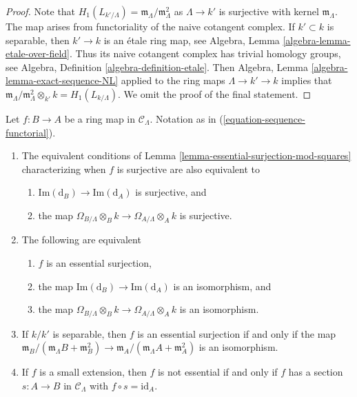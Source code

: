 \begin{proof}
Note that $H_1(L_{k'/\Lambda}) = \mathfrak m_\Lambda/\mathfrak m_\Lambda^2$
as $\Lambda \to k'$ is surjective with kernel $\mathfrak m_\Lambda$.
The map arises from functoriality of the naive cotangent complex.
If $k' \subset k$ is separable, then $k' \to k$ is an \'etale ring map, see
Algebra, Lemma \ref{algebra-lemma-etale-over-field}.
Thus its naive cotangent complex has trivial homology groups, see
Algebra, Definition \ref{algebra-definition-etale}.
Then
Algebra, Lemma \ref{algebra-lemma-exact-sequence-NL}
applied to the ring maps $\Lambda \to k' \to k$ implies that
$\mathfrak m_\Lambda/\mathfrak m_\Lambda^2 \otimes_{k'} k = H_1(L_{k/\Lambda})$.
We omit the proof of the final statement.
\end{proof}

\begin{lemma}
\label{lemma-essential-surjection}
Let $f: B \to A$ be a ring map in $\mathcal{C}_\Lambda$.
Notation as in (\ref{equation-sequence-functorial}).
\begin{enumerate}
\item The equivalent conditions of
Lemma \ref{lemma-essential-surjection-mod-squares}
characterizing when $f$ is surjective are also equivalent to
\begin{enumerate}
\item $\text{Im}(\text{d}_B) \to \text{Im}(\text{d}_A)$ is surjective, and
\item the map $\Omega_{B/\Lambda} \otimes_B k \to
\Omega_{A/\Lambda} \otimes_A k$ is surjective.
\end{enumerate}
\item The following are equivalent
\begin{enumerate}
\item $f$ is an essential surjection,
\item the map $\text{Im}(\text{d}_B) \to \text{Im}(\text{d}_A)$ is an
isomorphism, and
\item the map $\Omega_{B/\Lambda} \otimes_B k \to
\Omega_{A/\Lambda} \otimes_A k$ is an isomorphism.
\end{enumerate}
\item If $k/k'$ is separable, then $f$ is an essential surjection if
and only if the map
$\mathfrak m_B/(\mathfrak m_\Lambda B + \mathfrak m_B^2) \to
\mathfrak m_A/(\mathfrak m_\Lambda A + \mathfrak m_A^2)$
is an isomorphism.
\item If $f$ is a small extension, then $f$ is not essential if and only if
$f$ has a section $s: A \to B$ in $\mathcal{C}_\Lambda$
with $f \circ s = \text{id}_A$.
\end{enumerate}
\end{lemma}

